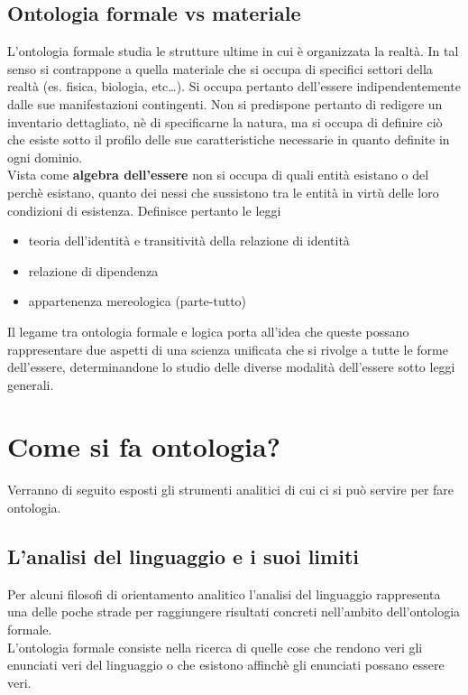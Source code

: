 \documentclass[a4paper,12pt]{article}
\begin{document}
\subsection{Ontologia formale vs materiale} %
L'ontologia formale studia le strutture ultime in cui è organizzata la realtà. In tal senso si contrappone
a quella materiale che si occupa di specifici settori della realtà (es. fisica, biologia, etc\dots). Si occupa pertanto
dell'essere indipendentemente dalle sue manifestazioni contingenti. Non si predispone pertanto di redigere un inventario
dettagliato, nè di specificarne la natura, ma si occupa di definire ciò che esiste sotto il profilo delle sue 
caratteristiche necessarie in quanto definite in ogni dominio.
\\Vista come \textbf{algebra dell'essere} non si occupa di quali entità esistano o del perchè esistano, quanto dei
nessi che sussistono tra le entità in virtù delle loro condizioni di esistenza. Definisce pertanto le leggi
\begin{itemize}
    \item teoria dell'identità e transitività della relazione di identità
    \item relazione di dipendenza
    \item appartenenza mereologica (parte-tutto)
\end{itemize}
Il legame tra ontologia formale e logica porta all'idea che queste possano rappresentare due aspetti di una scienza
unificata che si rivolge a tutte le forme dell'essere, determinandone lo studio delle diverse modalità dell'essere
sotto leggi generali.

\section{Come si fa ontologia?} %
Verranno di seguito esposti gli strumenti analitici di cui ci si può servire per fare ontologia.

\subsection{L'analisi del linguaggio e i suoi limiti} %
Per alcuni filosofi di orientamento analitico l'analisi del linguaggio rappresenta una delle poche strade per
raggiungere risultati concreti nell'ambito dell'ontologia formale.
\\L'ontologia formale consiste nella ricerca di quelle cose che rendono veri gli enunciati veri del linguaggio
o che esistono affinchè gli enunciati possano essere veri.
\end{document}
